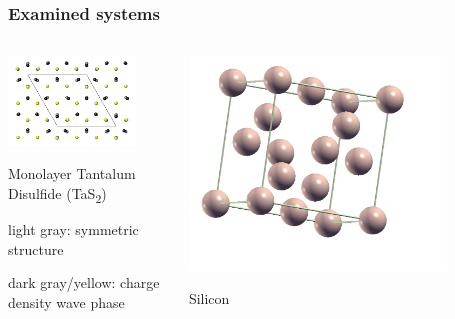 \documentclass[aspectratio=169]{beamer}
\newcommand{\TaS}{TaS\textsubscript{2}\xspace}
\begin{document}
\begin{frame}
	\frametitle{Examined systems}

	\begin{columns}
		\begin{column}{0.5\textwidth}
			\centering
			\includegraphics[width=0.8\textwidth]{figs/symmetric.pdf}

			\begin{center}
				Monolayer Tantalum Disulfide (\TaS)

				light gray: symmetric structure

				dark gray/yellow: charge density wave phase
			\end{center}
		\end{column}

		\begin{column}{0.5\textwidth}
			\centering
			\includegraphics[width=0.8\textwidth]{figs/Silicon.png}

			\begin{center}
				Silicon
			\end{center}
		\end{column}
	\end{columns}	

\end{frame}
\end{document}
